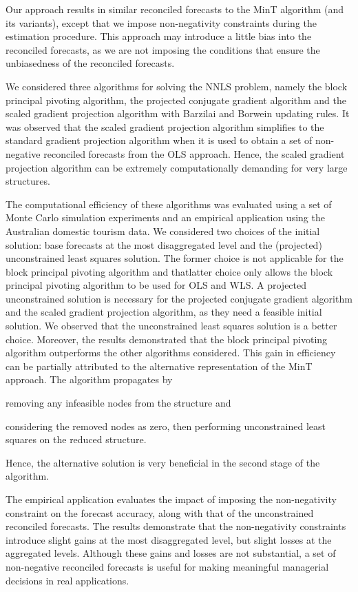 \documentclass[11pt]{article}
\newcommand{\0}{\phantom{0}}
\begin{document}
Our approach results in similar reconciled forecasts to the MinT algorithm (and its variants), except that we impose non-negativity constraints during the estimation procedure. This approach may introduce a little bias into the reconciled forecasts, as we are not imposing the conditions that ensure the unbiasedness of the reconciled forecasts.

We considered three algorithms for solving the NNLS problem, namely the block principal pivoting algorithm, the projected conjugate gradient algorithm and the scaled gradient projection algorithm with Barzilai and Borwein updating rules. It was observed that the scaled gradient projection algorithm simplifies to the standard gradient projection algorithm when it is used to obtain a set of non-negative reconciled forecasts from the OLS approach. Hence, the scaled gradient projection algorithm can be extremely computationally demanding for very large structures.

The computational efficiency of these algorithms was evaluated using a set of Monte Carlo simulation experiments and an empirical application using the Australian domestic tourism data. We considered two choices of the initial solution: base forecasts at the most disaggregated level and the (projected) unconstrained least squares solution. The former choice is not applicable for the block principal pivoting algorithm and  thatlatter choice only allows the block principal pivoting algorithm to be used for OLS and WLS\@. A projected unconstrained solution is necessary for the projected conjugate gradient algorithm and the scaled gradient projection algorithm, as they need a feasible initial solution. We observed that the unconstrained least squares solution is a better choice. Moreover, the results demonstrated that the block principal pivoting algorithm outperforms the other algorithms considered. This gain in efficiency can be partially attributed to the alternative representation of the MinT approach. The algorithm propagates by \begin{inparaenum}[(i)] \item removing any infeasible nodes from the structure and \item considering the removed nodes as zero, then performing unconstrained least squares on the reduced structure. \end{inparaenum} Hence, the alternative solution is very beneficial in the second stage of the algorithm.

The empirical application evaluates the impact of imposing the non-negativity constraint on the forecast accuracy, along with that of the unconstrained reconciled forecasts. The results demonstrate that the non-negativity constraints introduce slight gains at the most disaggregated level, but slight losses at the aggregated levels. Although these gains and losses are not substantial, a set of non-negative reconciled forecasts is useful for making meaningful managerial decisions in real applications.

\printbibliography
\end{document}
